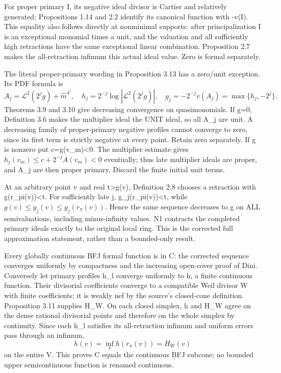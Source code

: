 \documentclass[11pt]{article}
\begin{document}
For proper primary I, its negative ideal divisor is Cartier and relatively generated; Propositions 1.14 and 2.2 identify its canonical function with -v(I). This equality also follows directly at nonminimal supports: after principalization I is an exceptional monomial times a unit, and the valuation and all sufficiently high retractions have the same exceptional linear combination. Proposition 2.7 makes the all-retraction infimum this actual ideal value. Zero is formal separately.

The literal proper-primary wording in Proposition 3.13 has a zero/unit exception. Its PDF formula is
\[
 A_j=\mathcal L^2(2^j g)+\widehat m^{4^j},\quad
 h_j=2^{-j}\log|\mathcal L^2(2^j g)|,\quad
 g_j=-2^{-j}v(A_j)=\max\{h_j,-2^j\}.
\]
Theorems 3.9 and 3.10 give decreasing convergence on quasimonomials. If g=0, Definition 3.6 makes the multiplier ideal the UNIT ideal, so all A\_j are unit. A decreasing family of proper-primary negative profiles cannot converge to zero, since its first term is strictly negative at every point. Retain zero separately. If g is nonzero put c=g(v\_m)<0. The multiplier estimate gives \(h_j(v_m)\le c+2^{-j}A(v_m)<0\) eventually; thus late multiplier ideals are proper, and A\_j are then proper primary. Discard the finite initial unit terms.

At an arbitrary point v and real t>g(v), Definition 2.8 chooses a retraction with g(r\_pi(v))<t. For sufficiently late j, g\_j(r\_pi(v))<t, while \(g(v)\le g_j(v)\le g_j(r_\pi(v))\). Hence the same sequence decreases to g on ALL semivaluations, including minus-infinity values. N1 contracts the completed primary ideals exactly to the original local ring. This is the corrected full approximation statement, rather than a bounded-only result.

Every globally continuous BFJ formal function is in C: the corrected sequence converges uniformly by compactness and the increasing open-cover proof of Dini. Conversely let primary profiles h\_l converge uniformly to h, a finite continuous function. Their divisorial coefficients converge to a compatible Weil divisor W with finite coefficients; it is weakly nef by the source's closed-cone definition. Proposition 3.11 supplies H\_W. On each closed simplex, h and H\_W agree on the dense rational divisorial points and therefore on the whole simplex by continuity. Since each h\_l satisfies its all-retraction infimum and uniform errors pass through an infimum,
\[
 h(v)=\inf_\pi h(r_\pi(v))=H_W(v)
\]
on the entire V. This proves C equals the continuous BFJ subcone; no bounded upper semicontinuous function is renamed continuous.
\end{document}
